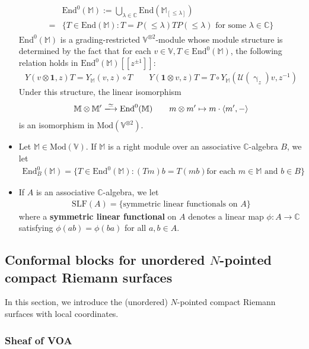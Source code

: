 \documentclass[11pt,b5paper,notitlepage]{article}
\theoremstyle{definition}
\theoremstyle{plain}
\newcommand{\mc}{\mathcal}
\newcommand{\End}{\mathrm{End}} %
\newcommand{\idt}{\mathbf{1}}
\newcommand{\SLF}{\mathrm{SLF}}
\newcommand{\Vbb}{\mathbb V}
\newcommand{\Mbb}{\mathbb M}
\newcommand{\Cbb}{\mathbb C}
\newcommand{\<}{\left\langle}
\renewcommand{\>}{\right\rangle}
\newcommand{\bk}[1]{\langle {#1}\rangle}
\newcommand{\Mod}{\mathrm{Mod}}
\numberwithin{equation}{section}
\begin{document}
\begin{itemize}
\begin{align}\label{eq87}
\begin{aligned}
	&\End^0(\Mbb):=\bigcup_{\lambda\in\Cbb} \End(\Mbb_{[\leq\lambda]})\\
=&\{T\in\End(\Mbb):T=P(\leq\lambda)TP(\leq\lambda)\text{ for some }\lambda\in\Cbb\}
\end{aligned}
\end{align}
$\End^0(\Mbb)$ is a grading-restricted $\Vbb^{\otimes 2}$-module whose module structure is determined by the fact that for each $v\in\Vbb,T\in\End^0(\Mbb)$, the following relation holds in $\End^0(\Mbb)[[z^{\pm1}]]$:
\begin{align*}
Y(v\otimes \idt,z) T=Y_\Mbb(v,z)\circ T\qquad Y(\idt\otimes v,z)T=T\circ Y_\Mbb (\mc U(\upgamma_z)v,z^{-1})
\end{align*}
Under this structure, the linear isomorphism
\begin{align*}
\Mbb\otimes\Mbb'\xlongrightarrow{\simeq}\End^0(\Mbb) \qquad m\otimes m'\mapsto m\cdot \bk{m',-}
\end{align*}
is an isomorphism in $\Mod(\Vbb^{\otimes 2})$.
\item Let $\Mbb\in\Mod(\Vbb)$. If $\Mbb$ is a right module over an associative $\Cbb$-algebra $B$, we let
\begin{align}\label{eq74}
\End_B^0(\Mbb)=\{T\in\End^0(\Mbb):(Tm)b=T(mb)\text{for each $m\in\Mbb$ and $b\in B$}\}
\end{align}
\item If $A$ is an associative $\Cbb$-algebra, we let 
\begin{align*}
\SLF(A)=\{\text{symmetric linear functionals on $A$}\}
\end{align*}
where a \textbf{symmetric linear functional} on $A$ denotes a linear map $\phi:A\rightarrow\Cbb$ satisfying $\phi(ab)=\phi(ba)$ for all $a,b\in A$.
\end{itemize}








\subsection{Conformal blocks for unordered $N$-pointed compact Riemann surfaces}\label{lb77}


In this section, we introduce the (unordered) $N$-pointed compact Riemann surfaces with local coordinates. 

\subsubsection{Sheaf of VOA}\label{lb52}
\end{document}

